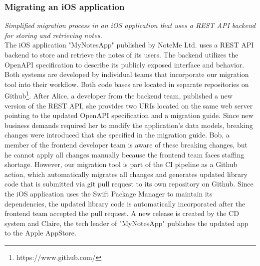 \subsubsection{Migrating an iOS application}
\label{subsubsec:Scenario:RESTScenario}

\textit{Simplified migration process in an iOS application that uses a REST API backend for storing and retrieving notes.}
\medskip
\\The iOS application "MyNotesApp" published by NoteMe Ltd. uses a REST API backend to store and retrieve the notes of its users. The backend utilizes the OpenAPI specification to describe its publicly exposed interface and behavior. Both systems are developed by individual teams that incorporate our migration tool into their workflow. Both code bases are located in separate repositories on Github\footnote{https://www.github.com/}. After Alice, a developer from the backend team, published a new version of the REST API, she provides two URIs located on the same web server pointing to the updated OpenAPI specification and a migration guide. Since new business demands required her to modify the application's data models, breaking changes were introduced that she specified in the migration guide. Bob, a member of the frontend developer team is aware of these breaking changes, but he cannot apply all changes manually because the frontend team faces staffing shortage. However, our migration tool is part of the CI pipeline as a Github action, which automatically migrates all changes and generates updated library code that is submitted via git pull request to its own repository on Github. Since the iOS application uses the Swift Package Manager to maintain its dependencies, the updated library code is automatically incorporated after the frontend team accepted the pull request. A new release is created by the CD system and Claire, the tech leader of "MyNotesApp" publishes the updated app to the Apple AppStore.